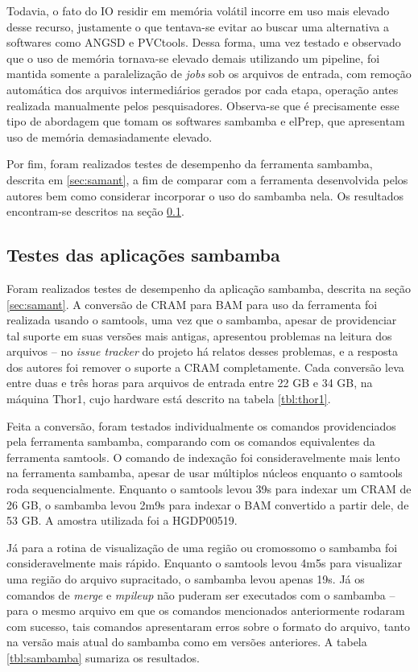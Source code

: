 \documentclass[cic,tc]{iiufrgs}
\begin{document}
Todavia, o fato do IO residir em memória volátil incorre em uso mais elevado
desse recurso, justamente o que tentava-se evitar ao buscar uma alternativa a
softwares como ANGSD e PVCtools. Dessa forma, uma vez testado e observado que o
uso de memória tornava-se elevado demais utilizando um pipeline, foi mantida
somente a paralelização de \textit{jobs} sob os arquivos de entrada, com
remoção automática dos arquivos intermediários gerados por cada etapa, operação
antes realizada manualmente pelos pesquisadores. Observa-se que é precisamente
esse tipo de abordagem que tomam os softwares sambamba e elPrep, que apresentam
uso de memória demasiadamente elevado.

Por fim, foram realizados testes de desempenho da ferramenta sambamba, descrita
em \ref{sec:samant}, a fim de comparar com a ferramenta desenvolvida pelos
autores bem como considerar incorporar o uso do sambamba nela. Os resultados
encontram-se descritos na seção \ref{sec:sambamba}.

\subsection{Testes das aplicações sambamba}
\label{sec:sambamba}

Foram realizados testes de desempenho da aplicação sambamba, descrita na seção
\ref{sec:samant}. A conversão de CRAM para BAM para uso da ferramenta foi
realizada usando o samtools, uma vez que o sambamba, apesar de providenciar tal
suporte em suas versões mais antigas, apresentou problemas na leitura dos
arquivos -- no \textit{issue tracker} do projeto há relatos desses problemas, e
a resposta dos autores foi remover o suporte a CRAM completamente. Cada
conversão leva entre duas e três horas para arquivos de entrada entre 22 GB e
34 GB, na máquina Thor1, cujo hardware está descrito na tabela \ref{tbl:thor1}.

Feita a conversão, foram testados individualmente os comandos providenciados
pela ferramenta sambamba, comparando com os comandos equivalentes da ferramenta
samtools. O comando de indexação foi consideravelmente mais lento na ferramenta
sambamba, apesar de usar múltiplos núcleos enquanto o samtools roda
sequencialmente. Enquanto o samtools levou 39s para indexar um CRAM de 26 GB, o
sambamba levou 2m9s para indexar o BAM convertido a partir dele, de 53 GB. A
amostra utilizada foi a HGDP00519.

Já para a rotina de visualização de uma região ou cromossomo o sambamba foi
consideravelmente mais rápido. Enquanto o samtools levou 4m5s para visualizar
uma região do arquivo supracitado, o sambamba levou apenas 19s. Já os comandos
de \textit{merge} e \textit{mpileup} não puderam ser executados com o sambamba
-- para o mesmo arquivo em que os comandos mencionados anteriormente rodaram
com sucesso, tais comandos apresentaram erros sobre o formato do arquivo, tanto
na versão mais atual do sambamba como em versões anteriores. A tabela
\ref{tbl:sambamba} sumariza os resultados.
\end{document}
